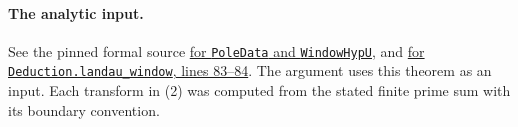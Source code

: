 \documentclass[11pt]{article}
\begin{document}
\paragraph{The analytic input.}
See the pinned formal source
\href{https://github.com/CocoSgt/riemann-hypothesis-lean/blob/7cbf7a0c32fca1badf05931879a37c3f8a2b03b4/src/Development/AutomorphicArithmetic/DedekindLFunctions/LandauZeroFreeCriterion.lean}
{for \texttt{PoleData} and \texttt{WindowHypU}}, and
\href{https://github.com/CocoSgt/riemann-hypothesis-lean/blob/7cbf7a0c32fca1badf05931879a37c3f8a2b03b4/src/Development/AutomorphicArithmetic/DedekindLFunctions/LandauTheorems/landauWindow.lean}
{for \texttt{Deduction.landau\_window}, lines 83--84}.
The argument uses this theorem as an input. Each transform in (2) was
computed from the stated finite prime sum with its boundary convention.
\end{document}
